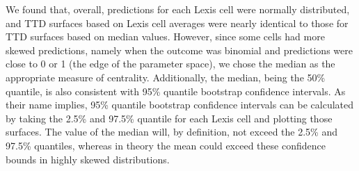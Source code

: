 \documentclass[11pt,oneside,a4paper]{article} %
\begin{document}
\begin{appendices}
We found that, overall, predictions for each Lexis cell were normally distributed, and TTD surfaces based on Lexis cell averages were nearly identical to those for TTD surfaces based on median values. However, since some cells had more skewed predictions, namely when the outcome was binomial and predictions were close to 0 or 1 (the edge of the parameter space), we chose the median as the appropriate measure of centrality. Additionally, the median, being the 50\% quantile, is also consistent with 95\% quantile bootstrap confidence intervals. As their name implies, 95\% quantile bootstrap confidence intervals can be calculated by taking the 2.5\% and 97.5\% quantile for each Lexis cell and plotting those surfaces. The value of the median will, by definition, not exceed the 2.5\% and 97.5\% quantiles, whereas in theory the mean could exceed these confidence bounds in highly skewed distributions.
\end{appendices}
\end{document}
